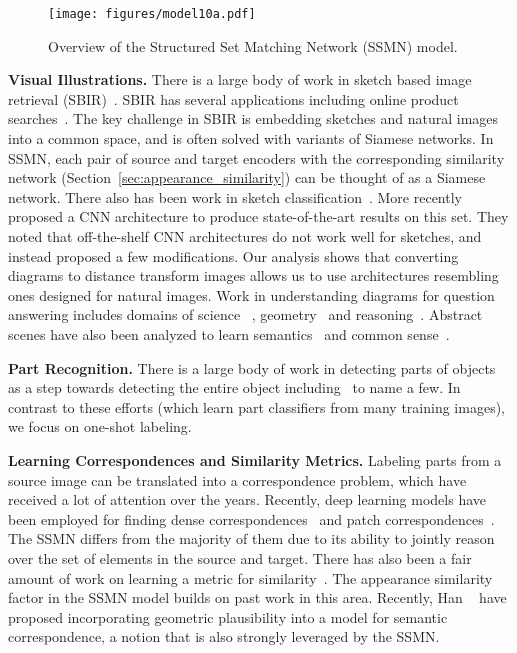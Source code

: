 \documentclass[10pt,twocolumn,letterpaper]{article}
\begin{document}
\begin{figure*}[t]
\centering
\texttt{[image: figures/model10a.pdf]}
\caption{\small Overview of the Structured Set Matching Network (SSMN) model.}
\vspace{-1em}
\label{fig:model}
\end{figure*}\noindent\textbf{Visual Illustrations.}
There is a large body of work in sketch based image retrieval (SBIR)~\cite{Yu2016SketchMT, sketchy2016, Wang2015Sketchbased3S, Zhang2011CoupledIE, Eitz2012SketchbasedSR}. SBIR has several applications including online product searches~\cite{Yu2016SketchMT}. The key challenge in SBIR is embedding sketches and natural images into a common space, and is often solved with variants of Siamese networks. In SSMN, each pair of source and target encoders with the corresponding similarity network (Section~\ref{sec:appearance_similarity}) can be thought of as a Siamese network. There also has been work in sketch classification~\cite{eitzHA12}. More recently~\cite{Yu2016SketchaNetAD} proposed a CNN architecture to produce state-of-the-art results on this set. They noted that off-the-shelf CNN architectures do not work well for sketches, and instead proposed a few modifications. Our analysis shows that converting diagrams to distance transform images allows us to use architectures resembling ones designed for natural images. Work in understanding diagrams for question answering includes domains of science ~\cite{Kembhavi2016ADI, Krishnamurthy2016SemanticPT}, geometry~\cite{Seo2014DiagramUI, Seo2015SolvingGP} and reasoning~\cite{Ghosh2017ContextualRF}. Abstract scenes have also been analyzed to learn semantics~\cite{Zitnick2013BringingSI} and common sense~\cite{Vedantam2015LearningCS}.

\noindent\textbf{Part Recognition.}
There is a large body of work in detecting parts of objects as a step towards detecting the entire object including~\cite{chenMLFUY14, felzenszwalb2010object, Zhu2010LatentHS, Shrivastava2013BuildingPO, Azizpour2012ObjectDU, Sun2011ArticulatedPM} to name a few. In contrast to these efforts (which learn part classifiers from many training images), we focus on one-shot labeling.

\noindent\textbf{Learning Correspondences and Similarity Metrics.}
Labeling parts from a source image can be translated into a correspondence problem, which have received a lot of attention over the years. Recently, deep learning models have been employed for finding dense correspondences~\cite{Choy2016UniversalCN, ham2016, Zbontar2015ComputingTS, hanRHWCSP17} and patch correspondences~\cite{Zagoruyko2015LearningTC, Jaderberg2015SpatialTN}. The SSMN differs from the majority of them due to its ability to jointly reason over the set of elements in the source and target. There has also been a fair amount of work on learning a metric for similarity~\cite{bromleyBB93, chopraHadsellLeCun05, songXJS16}. The appearance similarity factor in the SSMN model builds on past work in this area. Recently, Han \etal~\cite{hanRHWCSP17} have proposed incorporating geometric plausibility into a model for semantic correspondence, a notion that is also strongly leveraged by the SSMN.
\end{document}
